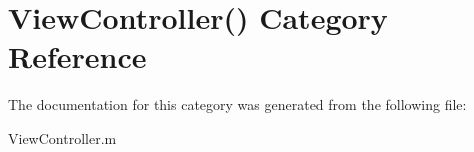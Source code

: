 \hypertarget{category_view_controller_07_08}{}\section{View\+Controller() Category Reference}
\label{category_view_controller_07_08}


The documentation for this category was generated from the following file\+:\begin{DoxyCompactItemize}
\item 
View\+Controller.\+m\end{DoxyCompactItemize}
